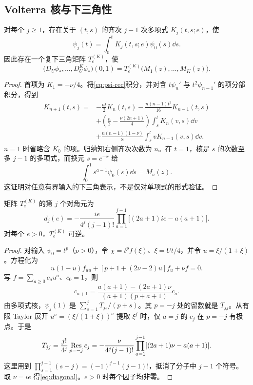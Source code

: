 \subsection{Volterra 核与下三角性}
\begin{lemma}[多项式核]\label{lem:kernel}
对每个 $j\ge1$，存在关于 $(t,s)$ 的齐次 $j-1$ 次多项式 $K_j(t,s;e)$，使
\begin{equation}\label{eq:kernel}
\psi_j(t)=\int_0^tK_j(t,s;e)\psi_0(s)\dd s.
\end{equation}
因此存在一个复下三角矩阵 $T^{(K)}_e$，使
\begin{equation}\label{eq:triangular}
\bigl(D_U\phi_*,\ldots,D_U^K\phi_*\bigr)(0,1)
=T^{(K)}_e\bigl(M_1(z),\ldots,M_K(z)\bigr).
\end{equation}
\end{lemma}
\begin{proof}
首项为 $K_1=-\nu/4$。将\eqref{eq:psi-rec}积分，并对含 $t\psi_n'$ 与 $t^2\psi_{n-1}'$ 的项分部积分，得到
\begin{equation}\label{eq:kernelrec}
\begin{aligned}
K_{n+1}(t,s)={}&-\frac{nt}{2}K_n(t,s)
-\frac{n(n-1)t^2}{16}K_{n-1}(t,s)\\
&+\left(\frac n2-\frac{\nu(2n+1)}4\right)\int_s^tK_n(v,s)\dd v\\
&+\frac{n(n-1)(1-\nu)}8\int_s^t vK_{n-1}(v,s)\dd v.
\end{aligned}
\end{equation}
$n=1$ 时省略含 $K_0$ 的项。归纳知右侧齐次次数为 $n$。在 $t=1$，核是 $s$ 的次数至多 $j-1$ 的多项式，而换元 $s=e^{-x}$ 给
\[
\int_0^1s^{a-1}\psi_0(s)\dd s=M_a(z).
\]
这证明对任意有界输入的下三角表示，不是仅对单项式的形式验证。
\end{proof}

\begin{proposition}[任意阶对角元]\label{prop:diagonal}
矩阵 $T_e^{(K)}$ 的第 $j$ 个对角元为
\begin{equation}\label{eq:diagonal}
\boxed{d_j(e)=-\frac{ie}{4^j(j-1)!}
\prod_{a=1}^{j-1}\bigl[(2a+1)ie-a(a+1)\bigr].}
\end{equation}
对每个 $e>0$，$T_e^{(K)}$ 可逆。
\end{proposition}
\begin{proof}
对输入 $\psi_0=t^p$（$p>0$），令 $\chi=t^p f(\xi)$、$\xi=Ut/4$，并令 $u=\xi/(1+\xi)$。方程化为
\[
u(1-u)f_{uu}+[p+1+(2\nu-2)u]f_u+\nu f=0.
\]
写 $f=\sum_{a\ge0}c_au^a$、$c_0=1$，则
\begin{equation}\label{eq:frob}
c_{a+1}=\frac{a(a+1)-(2a+1)\nu}{(a+1)(p+a+1)}c_a.
\end{equation}
由多项式核，$\psi_j(1)$ 是 $\sum_{s=1}^jT_{js}/(p+s)$。其 $p=-j$ 处的留数就是 $T_{jj}$。从有限 Taylor 展开 $u^a=(\xi/(1+\xi))^a$ 提取 $\xi^j$ 时，仅 $a=j$ 的 $c_j$ 在 $p=-j$ 有极点。于是
\[
T_{jj}=\frac{j!}{4^j}\mathop{\rm Res}_{p=-j}c_j
=-\frac\nu{4^j(j-1)!}
\prod_{a=1}^{j-1}[(2a+1)\nu-a(a+1)].
\]
这里用到 $\prod_{s=1}^{j-1}(s-j)=(-1)^{j-1}(j-1)!$，抵消了分子中 $j-1$ 个符号。取 $\nu=ie$ 得\eqref{eq:diagonal}。$e>0$ 时每个因子均非零。
\end{proof}

